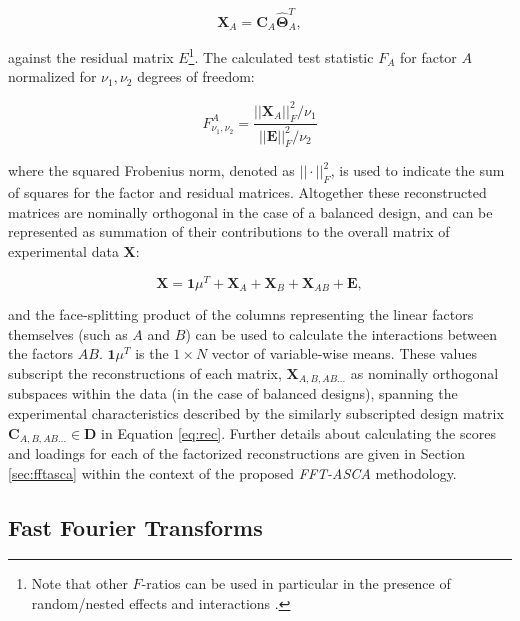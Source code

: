\documentclass[preprint,12pt]{elsarticle}
\begin{document}
\begin{equation}\label{eq:rec}
    \mathbf{X}_A = \mathbf{C}_A\mathbf{\hat{\Theta}}^T_A,
\end{equation}

\noindent against the residual matrix $E$\footnote{Note that other $F$-ratios can be used in particular in the presence of random/nested effects and interactions \cite{anderson2014permutational}.}. The calculated test statistic $F_A$ for factor $A$ normalized for $\nu_1, \nu_2$ degrees of freedom:

 \begin{equation}\label{eq:sig_test}
    F^A_{\nu_1,\nu_2} = \frac{||\mathbf{X}_A||_F^2/\nu_1}{||\mathbf{E}||^2_F/\nu_2}
\end{equation}

\noindent where the squared Frobenius norm, denoted as $||\cdot||^2_F$, is used to indicate the sum of squares for the factor and residual matrices. Altogether these reconstructed matrices are nominally orthogonal in the case of a balanced design, and can be represented as summation of their contributions to the overall matrix of experimental data $\mathbf{X}$:

\begin{equation}
    \mathbf{X} = \mathbf{1}\mu^T + \mathbf{X}_A + \mathbf{X}_B + \mathbf{X}_{AB} + \mathbf{E},
\end{equation}

\noindent and the face-splitting product of the columns representing the linear factors themselves (such as $A$ and $B$) can be used to calculate the interactions between the factors $AB$. $\mathbf{1}\mu^T$ is the $1\times N$ vector of variable-wise means. These values subscript the reconstructions of each matrix, $\mathbf{X}_{A,B,AB...}$ as nominally orthogonal subspaces within the data (in the case of balanced designs), spanning the experimental characteristics described by the similarly subscripted design matrix $\mathbf{C}_{A,B,AB...} \in \mathbf{D}$ in Equation \ref{eq:rec}. Further details about calculating the scores and loadings for each of the factorized reconstructions are given in Section \ref{sec:fftasca} within the context of the proposed \textit{FFT-ASCA} methodology.

\subsection{Fast Fourier Transforms}
\end{document}
